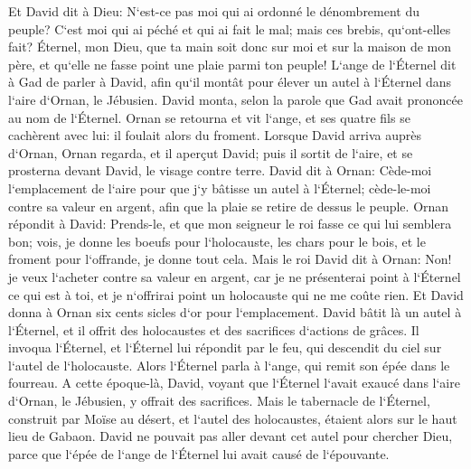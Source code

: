 \verse Et David dit à Dieu: N`est-ce pas moi qui ai ordonné le dénombrement du peuple? C`est moi qui ai péché et qui ai fait le mal; mais ces brebis, qu`ont-elles fait? Éternel, mon Dieu, que ta main soit donc sur moi et sur la maison de mon père, et qu`elle ne fasse point une plaie parmi ton peuple! 
\verse L`ange de l`Éternel dit à Gad de parler à David, afin qu`il montât pour élever un autel à l`Éternel dans l`aire d`Ornan, le Jébusien. 
\verse David monta, selon la parole que Gad avait prononcée au nom de l`Éternel. 
\verse Ornan se retourna et vit l`ange, et ses quatre fils se cachèrent avec lui: il foulait alors du froment. 
\verse Lorsque David arriva auprès d`Ornan, Ornan regarda, et il aperçut David; puis il sortit de l`aire, et se prosterna devant David, le visage contre terre. 
\verse David dit à Ornan: Cède-moi l`emplacement de l`aire pour que j`y bâtisse un autel à l`Éternel; cède-le-moi contre sa valeur en argent, afin que la plaie se retire de dessus le peuple. 
\verse Ornan répondit à David: Prends-le, et que mon seigneur le roi fasse ce qui lui semblera bon; vois, je donne les boeufs pour l`holocauste, les chars pour le bois, et le froment pour l`offrande, je donne tout cela. 
\verse Mais le roi David dit à Ornan: Non! je veux l`acheter contre sa valeur en argent, car je ne présenterai point à l`Éternel ce qui est à toi, et je n`offrirai point un holocauste qui ne me coûte rien. 
\verse Et David donna à Ornan six cents sicles d`or pour l`emplacement. 
\verse David bâtit là un autel à l`Éternel, et il offrit des holocaustes et des sacrifices d`actions de grâces. Il invoqua l`Éternel, et l`Éternel lui répondit par le feu, qui descendit du ciel sur l`autel de l`holocauste. 
\verse Alors l`Éternel parla à l`ange, qui remit son épée dans le fourreau. 
\verse A cette époque-là, David, voyant que l`Éternel l`avait exaucé dans l`aire d`Ornan, le Jébusien, y offrait des sacrifices. 
\verse Mais le tabernacle de l`Éternel, construit par Moïse au désert, et l`autel des holocaustes, étaient alors sur le haut lieu de Gabaon. 
\verse David ne pouvait pas aller devant cet autel pour chercher Dieu, parce que l`épée de l`ange de l`Éternel lui avait causé de l`épouvante. 

\chapter{}

